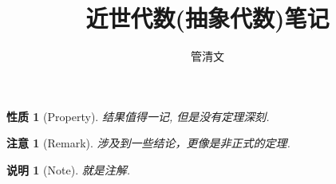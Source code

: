 \documentclass[UTF8]{ctexart}
\newtheorem*{RemarkNon}[Definition]{注意}
\newtheorem*{PropertyNon}[Definition]{性质}
\newtheorem*{NoteNon}[Definition]{说明}
\begin{document}
\title{近世代数(抽象代数)笔记}
\author{管清文}
\maketitle
\tableofcontents
\clearpage

\begin{PropertyNon}[Property]
结果值得一记, 但是没有定理深刻.
\end{PropertyNon}

\begin{RemarkNon}[Remark]
涉及到一些结论，更像是非正式的定理.
\end{RemarkNon}

\begin{NoteNon}[Note]
就是注解.
\end{NoteNon}

\setcounter{Definition}{0}




\end{document}
